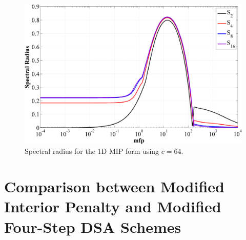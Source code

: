 \begin{figure}
\centering
\includegraphics[width=\textwidth]{figures/appendices/DSA_1D_SI_MIP_C=64.png}
\caption{Spectral radius for the 1D MIP form using $c=64$.}
\label{fig::1D_MIP_c=64}
\end{figure}

\newpage
\section{Comparison between Modified Interior Penalty and Modified Four-Step DSA Schemes}
\label{sec::App_DSA_M4S}


